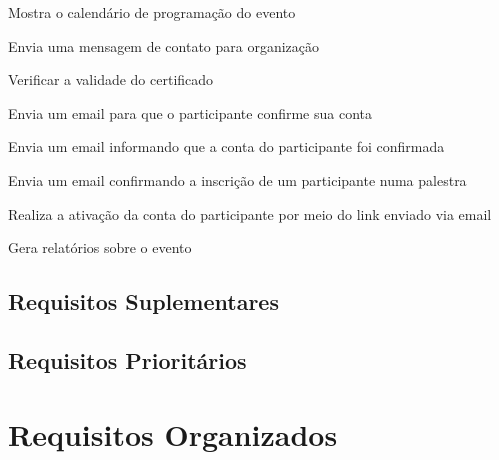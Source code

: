 \documentclass[12pt,a4paper]{article}
\begin{document}
        	{Mostra o calendário de programação do evento}
        	{%
        	
        	}
			
        	{Envia uma mensagem de contato para organização}
        	{%
        	
        	}
			
        	{Verificar a validade do certificado}
        	{%
        	
        	}
			
        	{Envia um email para que o participante confirme sua conta}
        	{%
        	
        	}
			
        	{Envia um email informando que a conta do participante foi confirmada}
        	{%
        	
        	}

			\FloatBarrier
        	{Envia um email confirmando a inscrição de um participante numa palestra}
        	{%
        	
        	}
			
        	{Realiza a ativação da conta do participante por meio do link enviado via email}
        	{%
        	
        	}

        	{Gera relatórios sobre o evento}
        	{%
        	
        	}

        	\clearpage
        	\subsection{Requisitos Suplementares}
        	
        	\subsection{Requisitos Prioritários}
        	
        	\newpage
        	\section{Requisitos Organizados}
\end{document}
